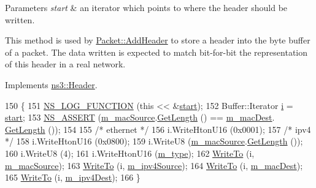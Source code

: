 \begin{DoxyParams}{Parameters}
{\em start} & an iterator which points to where the header should be written.\\
\hline
\end{DoxyParams}
This method is used by \hyperlink{classns3_1_1Packet_a465108c595a0bc592095cbcab1832ed8}{Packet\+::\+Add\+Header} to store a header into the byte buffer of a packet. The data written is expected to match bit-\/for-\/bit the representation of this header in a real network. 

Implements \hyperlink{classns3_1_1Header_afb61f1aac69ff8349a6bfe521fab5404}{ns3\+::\+Header}.


\begin{DoxyCode}
150 \{
151   \hyperlink{log-macros-disabled_8h_a90b90d5bad1f39cb1b64923ea94c0761}{NS\_LOG\_FUNCTION} (\textcolor{keyword}{this} << &\hyperlink{namespacevisualizer_1_1core_a2a35e5d8a34af358b508dac8635754e0}{start});
152   Buffer::Iterator \hyperlink{bernuolliDistribution_8m_a6f6ccfcf58b31cb6412107d9d5281426}{i} = \hyperlink{namespacevisualizer_1_1core_a2a35e5d8a34af358b508dac8635754e0}{start};
153   \hyperlink{assert_8h_a6dccdb0de9b252f60088ce281c49d052}{NS\_ASSERT} (\hyperlink{classns3_1_1ArpHeader_a203567d8a9119ebb3d8f572627711467}{m\_macSource}.\hyperlink{classns3_1_1Address_a0b475044755d73618f308cd9438dd8ef}{GetLength} () == \hyperlink{classns3_1_1ArpHeader_ab30b05ca3579eab9ec112456a5d8fed9}{m\_macDest}.
      \hyperlink{classns3_1_1Address_a0b475044755d73618f308cd9438dd8ef}{GetLength} ());
154 
155   \textcolor{comment}{/* ethernet */}
156   i.WriteHtonU16 (0x0001);
157   \textcolor{comment}{/* ipv4 */}
158   i.WriteHtonU16 (0x0800);
159   i.WriteU8 (\hyperlink{classns3_1_1ArpHeader_a203567d8a9119ebb3d8f572627711467}{m\_macSource}.\hyperlink{classns3_1_1Address_a0b475044755d73618f308cd9438dd8ef}{GetLength} ());
160   i.WriteU8 (4);
161   i.WriteHtonU16 (\hyperlink{classns3_1_1ArpHeader_a8b5d651b2153bd85714a376df62e93e0}{m\_type});
162   \hyperlink{namespacens3_abe3cb0173e87a3f7e2e414358c0a08bf}{WriteTo} (i, \hyperlink{classns3_1_1ArpHeader_a203567d8a9119ebb3d8f572627711467}{m\_macSource});
163   \hyperlink{namespacens3_abe3cb0173e87a3f7e2e414358c0a08bf}{WriteTo} (i, \hyperlink{classns3_1_1ArpHeader_aedf1d03e058ebff6ffdbcbe01582e4a5}{m\_ipv4Source});
164   \hyperlink{namespacens3_abe3cb0173e87a3f7e2e414358c0a08bf}{WriteTo} (i, \hyperlink{classns3_1_1ArpHeader_ab30b05ca3579eab9ec112456a5d8fed9}{m\_macDest});
165   \hyperlink{namespacens3_abe3cb0173e87a3f7e2e414358c0a08bf}{WriteTo} (i, \hyperlink{classns3_1_1ArpHeader_acaf790c20dd771889204740c70c7fdc0}{m\_ipv4Dest});
166 \}
\end{DoxyCode}


